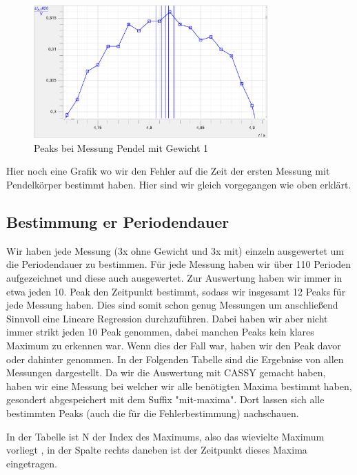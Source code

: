 \documentclass[twoside]{protokoll}
\begin{document}
\begin{figure}[H]
    \centering
    \includegraphics[width=0.8\textwidth]{plots/unsicherheit-bestimmen-gewicht-1.pdf}
    \caption{Peaks bei Messung Pendel mit Gewicht 1}
\end{figure}

Hier noch eine Grafik wo wir den Fehler auf die Zeit der ersten Messung mit Pendelkörper bestimmt haben. 
Hier sind wir gleich vorgegangen wie oben erklärt. 

\subsection{Bestimmung er Periodendauer}
Wir haben jede Messung (3x ohne Gewicht und 3x mit) einzeln ausgewertet um die Periodendauer zu bestimmen.
Für jede Messung haben wir über 110 Perioden aufgezeichnet und diese auch ausgewertet. 
Zur Auswertung haben wir immer in etwa jeden 10. Peak den Zeitpunkt bestimmt, sodass wir insgesamt 12 Peaks für jede Messung haben.
Dies sind somit schon genug Messungen um anschließend Sinnvoll eine Lineare Regression durchzuführen.
Dabei haben wir aber nicht immer strikt jeden 10 Peak genommen, dabei manchen Peaks kein klares Maximum zu erkennen war.
Wenn dies der Fall war, haben wir den Peak davor oder dahinter genommen.
In der Folgenden Tabelle sind die Ergebnise von allen Messungen dargestellt.
Da wir die Auswertung mit CASSY gemacht haben, haben wir eine Messung bei welcher wir alle benötigten Maxima bestimmt haben, gesondert abgespeichert mit dem Suffix "mit-maxima".
Dort lassen sich alle bestimmten Peaks (auch die für die Fehlerbestimmung) nachschauen.

In der Tabelle ist N der Index des Maximums, also das wievielte Maximum vorliegt , in der Spalte rechts daneben ist der Zeitpunkt dieses Maxima eingetragen.
\end{document}
